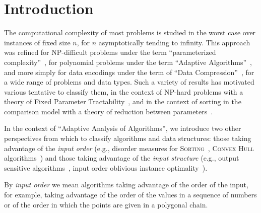 \section{Introduction}
\label{sec:intro}


The computational complexity of most problems is studied in the worst
case over instances of fixed size $n$, for $n$ asymptotically tending
to infinity. This approach was refined for NP-difficult problems under
the term ``parameterized
complexity''~\cite{2006-BOOK-ParameterizedComplexityTheory-FlumGrohe},
for polynomial problems under the term ``Adaptive
Algorithms''~\cite{1992-ACMCS-ASurveyOfAdaptiveSortingAlgorithms-EstivillCastroWood,1992-ACJ-AnOverviewOfAdaptiveSorting-MoffatPetersson},
and more simply for data encodings under the term of ``Data
Compression''~\cite{2013-TCS-OnCompressingPermutationsAndAdaptiveSorting-BarbayNavarro},
for a wide range of problems and data types.
Such a variety of results has motivated various tentative to classify
them, in the context of NP-hard problems with a theory of Fixed
Parameter
Tractability~\cite{2006-BOOK-ParameterizedComplexityTheory-FlumGrohe},
and in the context of sorting in the comparison model with a theory of
reduction between
parameters~\cite{1995-DAM-AFrameworkForAdaptiveSorting-PeterssonMoffat}.


In the context of ``Adaptive Analysis of Algorithms'', we introduce
two other perspectives from which to classify algorithms and data
structures: those taking advantage of the \emph{input order} (e.g.,
disorder measures for
\textsc{Sorting}~\cite{1992-ACJ-AnOverviewOfAdaptiveSorting-MoffatPetersson,1992-ACMCS-ASurveyOfAdaptiveSortingAlgorithms-EstivillCastroWood},
\textsc{Convex Hull}
algorithms~\cite{2002-SWAT-AdaptiveAlgorithmsForConstructingConvexHullsAndTriangulationsOfPolygonalChains-LevcopoulosLingasMitchell})
and those taking advantage of the \emph{input structure} (e.g., output
sensitive
algorithms~\cite{1986-JCom-TheUltimatePlanarConvexHullAlgorithm-KirkpatrickSeidel},
input order oblivious instance
optimality~\cite{2009-FOCS-InstanceOptimalGeometricAlgorithms-AfshaniBarbayChan}).

By \emph{input order} we mean algorithms taking advantage of the order
of the input, for example, taking advantage of the order of the values
in a sequence of numbers or of the order in which the points are given
in a polygonal chain.

